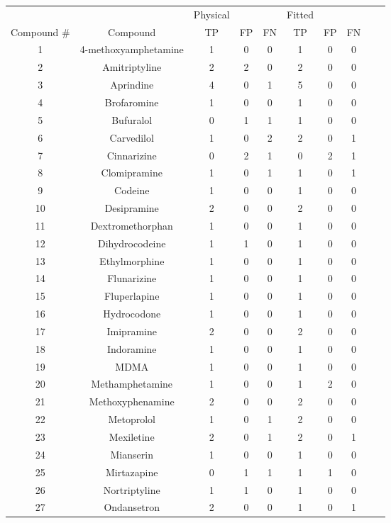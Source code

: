 \begin{table}[h]
\singlespace
\footnotesize
\centering
\begin{tabular}{cccccccccc}
\hline
 & & Physical & & & Fitted & & \\
Compound \# & Compound & TP & FP & FN & TP & FP & FN \\
\hline
1 & 4-methoxyamphetamine & 1 & 0 & 0 & 1 & 0 & 0 \\
2 & Amitriptyline & 2 & 2 & 0 & 2 & 0 & 0 \\
3 & Aprindine & 4 & 0 & 1 & 5 & 0 & 0 \\
4 & Brofaromine & 1 & 0 & 0 & 1 & 0 & 0 \\
5 & Bufuralol & 0 & 1 & 1 & 1 & 0 & 0 \\
6 & Carvedilol & 1 & 0 & 2 & 2 & 0 & 1 \\
7 & Cinnarizine & 0 & 2 & 1 & 0 & 2 & 1 \\
8 & Clomipramine & 1 & 0 & 1 & 1 & 0 & 1 \\
9 & Codeine & 1 & 0 & 0 & 1 & 0 & 0 \\
10 & Desipramine & 2 & 0 & 0 & 2 & 0 & 0 \\
11 & Dextromethorphan & 1 & 0 & 0 & 1 & 0 & 0 \\
12 & Dihydrocodeine & 1 & 1 & 0 & 1 & 0 & 0 \\
13 & Ethylmorphine & 1 & 0 & 0 & 1 & 0 & 0 \\
14 & Flunarizine & 1 & 0 & 0 & 1 & 0 & 0 \\
15 & Fluperlapine & 1 & 0 & 0 & 1 & 0 & 0 \\
16 & Hydrocodone & 1 & 0 & 0 & 1 & 0 & 0 \\
17 & Imipramine & 2 & 0 & 0 & 2 & 0 & 0 \\
18 & Indoramine & 1 & 0 & 0 & 1 & 0 & 0 \\
19 & MDMA & 1 & 0 & 0 & 1 & 0 & 0 \\
20 & Methamphetamine & 1 & 0 & 0 & 1 & 2 & 0 \\
21 & Methoxyphenamine & 2 & 0 & 0 & 2 & 0 & 0 \\
22 & Metoprolol & 1 & 0 & 1 & 2 & 0 & 0 \\
23 & Mexiletine & 2 & 0 & 1 & 2 & 0 & 1 \\
24 & Mianserin & 1 & 0 & 0 & 1 & 0 & 0 \\
25 & Mirtazapine & 0 & 1 & 1 & 1 & 1 & 0 \\
26 & Nortriptyline & 1 & 1 & 0 & 1 & 0 & 0 \\
27 & Ondansetron & 2 & 0 & 0 & 1 & 0 & 1 \\

\end{tabular}
\end{table}
